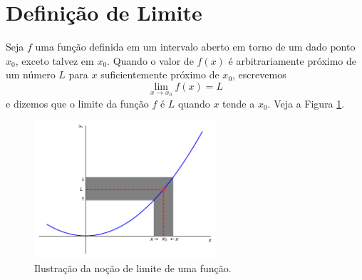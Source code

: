 \cleardoublepage\documentclass[../main.tex]{subfiles}
\begin{document}
\section{Definição de Limite}\hypertarget{ConceitoLimite}{}
Seja $f$ uma função definida em um intervalo aberto em torno de um dado ponto $x_0$, exceto talvez em $x_0$. Quando o valor de $f(x)$ é arbitrariamente próximo de um número $L$ para $x$ suficientemente próximo de $x_0$, escrevemos
\begin{equation*}
  \lim_{x\to x_0} f(x) = L
\end{equation*}
e dizemos que o limite da função $f$ é $L$ quando $x$ tende a $x_0$. Veja a Figura \ref{fig:lim}.

\begin{figure}[H]
  \centering
  \includegraphics[width=0.6\textwidth]{fig_lim/fig_lim}
  \caption{Ilustração da noção de limite de uma função.}
  \label{fig:lim}
\end{figure}
\end{document}

